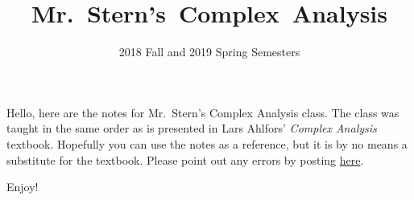\documentclass[12pt]{scrartcl}
\title{Mr.\ Stern's\ Complex\ Analysis}
\subtitle{2018 Fall and 2019 Spring Semesters}
\date{}
\begin{document}
\maketitle


Hello, here are the notes for Mr.\ Stern's Complex Analysis class.
The class was taught in the same order as is presented in Lars Ahlfors'
\textit{Complex Analysis} textbook.
Hopefully you can use the notes as a reference, but it is by no means
a substitute for the textbook.
Please point out any errors by posting \href{https://github.com/mkendall17/cmplxnotes1819}{here}.

\vspace{0.3cm}
Enjoy!

\tableofcontents
\pagebreak





















\end{document}
